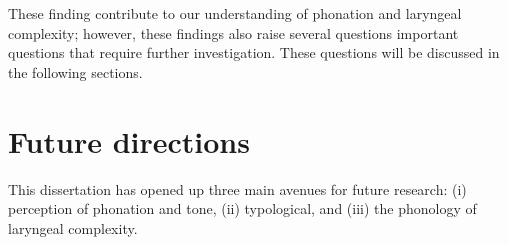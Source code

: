 These finding contribute to our understanding of phonation and laryngeal complexity; however, these findings also raise several questions important questions that require further investigation. These questions will be discussed in the following sections. 

\section{Future directions}\label{sec:future_directions}
This dissertation has opened up three main avenues for future research: (i) perception of phonation and tone, (ii) typological, and (iii) the phonology of laryngeal complexity.




